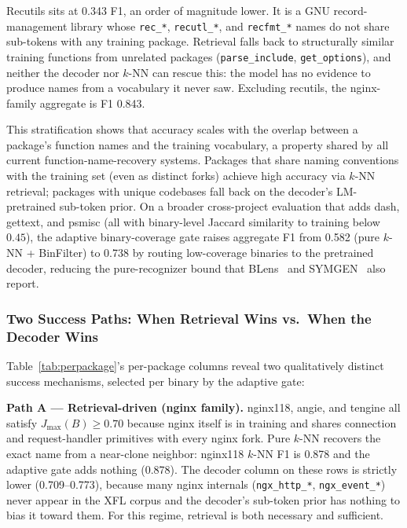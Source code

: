 \documentclass[sigconf,nonacm]{acmart}
\begin{document}
Recutils sits at 0.343 F1, an order of magnitude lower. It is a GNU record-management library whose \texttt{rec\_*}, \texttt{recutl\_*}, and \texttt{recfmt\_*} names do not share sub-tokens with any training package. Retrieval falls back to structurally similar training functions from unrelated packages (\texttt{parse\_include}, \texttt{get\_options}), and neither the decoder nor $k$-NN can rescue this: the model has no evidence to produce names from a vocabulary it never saw. Excluding recutils, the nginx-family aggregate is F1 0.843.

This stratification shows that accuracy scales with the overlap between a package's function names and the training vocabulary, a property shared by all current function-name-recovery systems. Packages that share naming conventions with the training set (even as distinct forks) achieve high accuracy via $k$-NN retrieval; packages with unique codebases fall back on the decoder's LM-pretrained sub-token prior. On a broader cross-project evaluation that adds dash, gettext, and psmisc (all with binary-level Jaccard similarity to training below $0.45$), the adaptive binary-coverage gate raises aggregate F1 from 0.582 (pure $k$-NN + BinFilter) to 0.738 by routing low-coverage binaries to the pretrained decoder, reducing the pure-recognizer bound that BLens~\cite{blens} and SYMGEN~\cite{symgen} also report.

\subsubsection{Two Success Paths: When Retrieval Wins vs.\ When the Decoder Wins}
\label{sec:two-paths}

Table~\ref{tab:perpackage}'s per-package columns reveal two qualitatively distinct success mechanisms, selected per binary by the adaptive gate:

\textbf{Path A --- Retrieval-driven (nginx family).} nginx118, angie, and tengine all satisfy $J_{\max}(B) \ge 0.70$ because nginx itself is in training and shares connection and request-handler primitives with every nginx fork. Pure $k$-NN recovers the exact name from a near-clone neighbor: nginx118 $k$-NN F1 is 0.878 and the adaptive gate adds nothing (0.878). The decoder column on these rows is strictly lower (0.709--0.773), because many nginx internals (\texttt{ngx\_http\_*}, \texttt{ngx\_event\_*}) never appear in the XFL corpus and the decoder's sub-token prior has nothing to bias it toward them. For this regime, retrieval is both necessary and sufficient.
\end{document}
